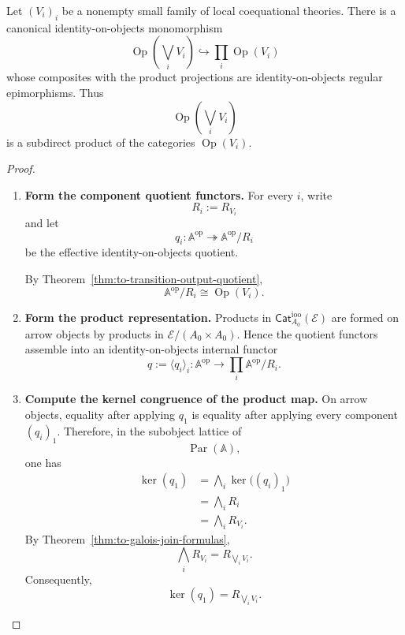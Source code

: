 \begin{theorem}
\label{thm:to-subdirect-product}
    Let \((V_i)_i\) be a nonempty small family of local coequational theories.
    There is a canonical identity-on-objects monomorphism
    \[
        \operatorname{Op}\left(\bigvee_iV_i\right)
        \hookrightarrow
        \prod_i\operatorname{Op}(V_i)
    \]
    whose composites with the product projections are
    identity-on-objects regular epimorphisms. Thus
    \[
        \operatorname{Op}\left(\bigvee_iV_i\right)
    \]
    is a subdirect product of the categories
    \(\operatorname{Op}(V_i)\).
\end{theorem}

\begin{proof}
    \leavevmode
    \begin{enumerate}
        \item \textbf{Form the component quotient functors.}
        For every \(i\), write
        \[
            R_i:=R_{V_i}
        \]
        and let
        \[
            q_i:
            \mathbb A^{\mathrm{op}}
            \twoheadrightarrow
            \mathbb A^{\mathrm{op}}/R_i
        \]
        be the effective identity-on-objects quotient.

        By
        Theorem~\ref{thm:to-transition-output-quotient},
        \[
            \mathbb A^{\mathrm{op}}/R_i
            \cong
            \operatorname{Op}(V_i).
        \]

        \item \textbf{Form the product representation.}
        Products in
        \(\mathsf{Cat}_{A_0}^{\mathrm{ioo}}(\mathcal E)\)
        are formed on arrow objects by products in
        \(\mathcal E/(A_0\times A_0)\).
        Hence the quotient functors assemble into an
        identity-on-objects internal functor
        \[
            q
            :=
            \langle q_i\rangle_i:
            \mathbb A^{\mathrm{op}}
            \longrightarrow
            \prod_i
            \mathbb A^{\mathrm{op}}/R_i.
        \]

        \item \textbf{Compute the kernel congruence of the product map.}
        On arrow objects, equality after applying \(q_1\) is equality after
        applying every component \((q_i)_1\). Therefore, in the subobject
        lattice of
        \[
            \operatorname{Par}(\mathbb A),
        \]
        one has
        \[
        \begin{aligned}
            \ker(q_1)
            &=
            \bigwedge_i
            \ker\bigl((q_i)_1\bigr)
            \\
            &=
            \bigwedge_iR_i
            \\
            &=
            \bigwedge_iR_{V_i}.
        \end{aligned}
        \]
        By
        Theorem~\ref{thm:to-galois-join-formulas},
        \[
            \bigwedge_iR_{V_i}
            =
            R_{\bigvee_iV_i}.
        \]
        Consequently,
        \[
            \ker(q_1)
            =
            R_{\bigvee_iV_i}.
        \]


\end{enumerate}
\end{proof}
